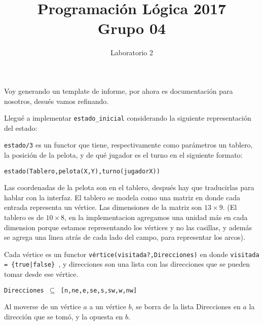 \documentclass[12pt]{article}
\title{Programaci\'on L\'ogica 2017 \\ Grupo 04}
\date{ Laboratorio 2 }
\begin{document}
\maketitle


\newpage

Voy generando un template de informe, por ahora es documentaci\'on
para nosotros, desu\'es vamos refinando.


Llegu\'e a implementar {\tt estado\_inicial} considerando la
siguiente representaci\'on del estado:

{\tt estado\slash3} es un functor que tiene, respectivamente como par\'ametros
un tablero, la posici\'on de la pelota, y de qu\'e jugador es el turno en el
siguiente formato:

{\tt estado(Tablero,pelota(X,Y),turno(jugadorX))}

Las coordenadas de la pelota son en el tablero, despu\'es hay que traducirlas
para hablar con la interfaz.
El tablero se modela como una matriz en donde cada entrada representa un
v\'ertice. Las dimensiones de la matriz son $13\times9$.
(El tablero es de $10 \times 8$, en la implementacion agregamos una unidad
m\'as en cada dimension porque estamos representando los v\'ertices
y no las casillas, y adem\'as se agrega una linea atr\'as de cada lado
del campo, para representar los arcos).

Cada v\'ertice es un functor {\tt v\'ertice(visitada?,Direcciones)} en donde
{\tt visitada = \{true|false\} }, y direcciones son una lista con las
direcciones que se pueden tomar desde ese v\'ertice.

{\tt Direcciones $\subseteq$ [n,ne,e,se,s,sw,w,nw]}

Al moverse de un v\'ertice $a$ a un v\'ertice $b$, se borra de la lista
Direcciones en $a$ la direcci\'on que se tom\'o, y la opuesta en $b$.
\end{document}
